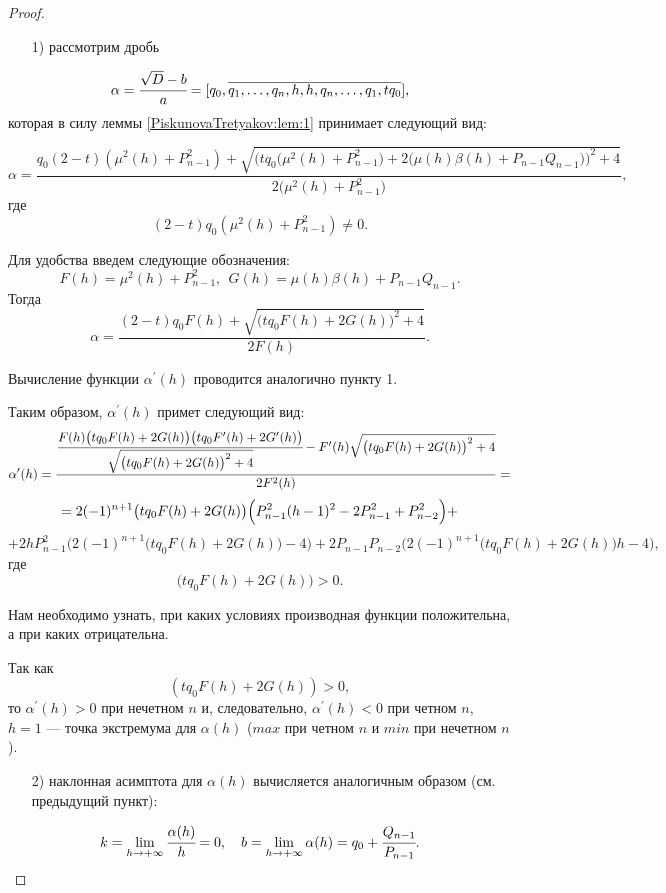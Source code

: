 \begin{proof}

\begin{enumerate}
\item[1) ]рассмотрим дробь
\end{enumerate}
$$\alpha=\cfrac {\sqrt {D}-b}a=[{q_0},\overline{{q_1},\dots,{q_n},{h},{h},{q_n},\dots,{q_1},t{q_0}}],$$
которая в силу леммы \ref{PiskunovaTretyakov:lem:1} принимает следующий вид:

\begin{equation}
\alpha=\frac {{q_0}(2-t)({\mu}^{2}(h)+{P^{2}_{n-1}})+\sqrt{\biggl(t{q_0}\bigl({\mu}^{2}(h)+P^{2}_{n-1}\bigr)+
2\bigl({{\mu(h)}{\beta(h)}+{P_{n-1}}{Q_{n-1}}}\bigr)\biggr)^2+4}}{2\bigl({\mu}^{2}(h)+P^{2}_{n-1}\bigr)},
\end{equation}
где
\[(2-t){q_0}({\mu}^{2}(h)+{P^{2}_{n-1}})\neq0.\]

Для удобства введем следующие обозначения:
\[F(h)={\mu}^{2}(h)+P^{2}_{n-1},  \ \ G(h)={{\mu(h)}{\beta(h)}+{P_{n-1}}{Q_{n-1}}}.\]
Тогда
\[\alpha=\frac {(2-t){q_0}F(h)+\sqrt{\bigl(t{q_0}F(h)+2G(h)\bigr)^2+4}}{2F(h)}.\]

Вычисление функции ${\alpha}^\prime(h)$ проводится аналогично пункту 1.

Таким образом, ${\alpha}^\prime(h)$ примет следующий вид:
\[{\alpha}^\prime(h)=\frac {\cfrac {F(h)\bigl(t{q_0}F(h)+2G(h)\bigr)\bigl(t{q_0}F^\prime(h)+2G^\prime(h)\bigr)}{\sqrt {\bigl(t{q_0}F(h)+2G(h)\bigr)^{2}+4}}-F^\prime(h)\sqrt {\bigl(t{q_0}F(h)+2G(h)\bigr)^{2}+4}}{2F^{2}(h)}=\]
\[=2(-1)^{n+1}\bigl(t{q_0}F(h)+2G(h)\bigr)\Bigl({P^{2}_{n-1}}(h-1)^{2}-2{P^{2}_{n-1}}+{P^{2}_{n-2}}\Bigr)+\]
\[+2h{P^{2}_{n-1}}\biggl(2(-1)^{n+1}\bigl(t{q_0}F(h)+2G(h)\bigr)-4\biggr)+
2{P_{n-1}}{P_{n-2}}\biggl(2(-1)^{n+1}\bigl(t{q_0}F(h)+2G(h)\bigr)h-4\biggr),\]
где
\[\bigl(t{q_0}F(h)+2G(h)\bigr)>0.\]

Нам необходимо узнать, при каких условиях производная функции положительна, а при каких отрицательна.

Так как
\[(t{q_0}F(h)+2G(h))>0,\]
то ${\alpha}^\prime(h)>0$ при нечетном $n$ и, следовательно, ${\alpha}^\prime(h)<0$ при четном $n$, $h=1$ --- точка экстремума для $\alpha(h)$ ($max$ при четном $n$ и $min$ при нечетном $n$).


\begin{enumerate}
\item[2) ]наклонная асимптота для $\alpha(h)$ вычисляется аналогичным образом (см. предыдущий пункт):
\end{enumerate}
\[k=\lim_{h\to +\infty}\cfrac {\alpha(h)}h=0, \ \ \ b=\lim_{h\to +\infty}\alpha(h)={q_0}+\cfrac {Q_{n-1}}{P_{n-1}}.\]
\end{proof}


